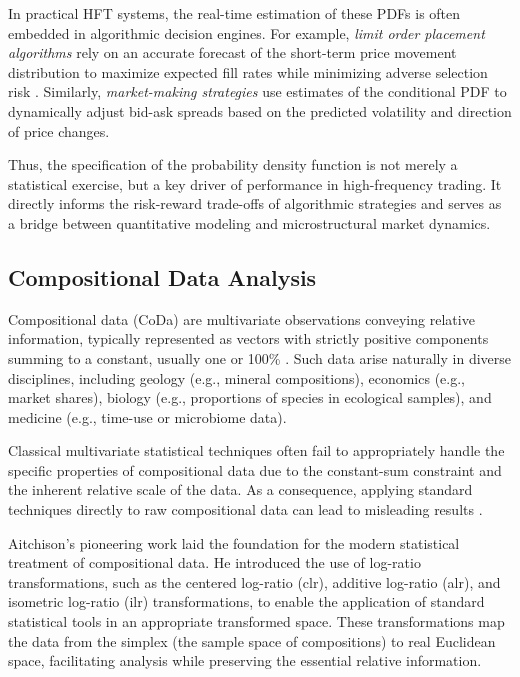 \documentclass[article]{abntex2}
\begin{document}
In practical HFT systems, the real-time estimation of these PDFs is often embedded in algorithmic decision engines. For example, \textit{limit order placement algorithms} rely on an accurate forecast of the short-term price movement distribution to maximize expected fill rates while minimizing adverse selection risk . Similarly, \textit{market-making strategies} use estimates of the conditional PDF to dynamically adjust bid-ask spreads based on the predicted volatility and direction of price changes.

Thus, the specification of the probability density function is not merely a statistical exercise, but a key driver of performance in high-frequency trading. It directly informs the risk-reward trade-offs of algorithmic strategies and serves as a bridge between quantitative modeling and microstructural market dynamics.

\subsection{Compositional Data Analysis}
Compositional data (CoDa) are multivariate observations conveying relative information, typically represented as vectors with strictly positive components summing to a constant, usually one or 100\% \cite{aitchison1982statistical}. Such data arise naturally in diverse disciplines, including geology (e.g., mineral compositions), economics (e.g., market shares), biology (e.g., proportions of species in ecological samples), and medicine (e.g., time-use or microbiome data).

Classical multivariate statistical techniques often fail to appropriately handle the specific properties of compositional data due to the constant-sum constraint and the inherent relative scale of the data. As a consequence, applying standard techniques directly to raw compositional data can lead to misleading results \cite{pawlowsky2015modelling}.

Aitchison's pioneering work \cite{aitchison1986statistical} laid the foundation for the modern statistical treatment of compositional data. He introduced the use of log-ratio transformations, such as the centered log-ratio (clr), additive log-ratio (alr), and isometric log-ratio (ilr) transformations, to enable the application of standard statistical tools in an appropriate transformed space. These transformations map the data from the simplex (the sample space of compositions) to real Euclidean space, facilitating analysis while preserving the essential relative information.
\end{document}
